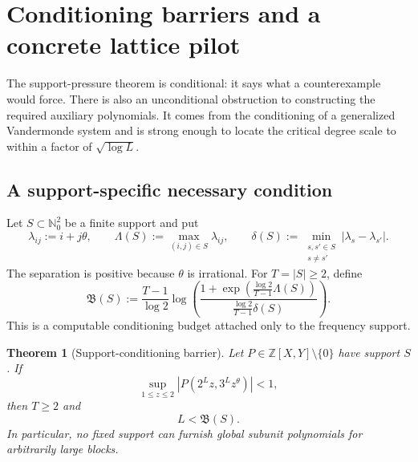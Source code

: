 \documentclass[11pt,oneside]{article}
\newtheorem{theorem}{Theorem}[section]
\theoremstyle{definition}
\theoremstyle{remark}
\newcommand{\Nzero}{\mathbb N_0}
\newcommand{\Z}{\mathbb Z}
\newcommand{\tht}{\theta}
\begin{document}
\section{Conditioning barriers and a concrete lattice pilot}
\label{sec:conditioning}

The support-pressure theorem is conditional: it says what a counterexample would force.  There is
also an unconditional obstruction to constructing the required auxiliary polynomials.  It comes
from the conditioning of a generalized Vandermonde system and is strong enough to locate the
critical degree scale to within a factor of $\sqrt{\log L}$.

\subsection{A support-specific necessary condition}

Let $S\subset\Nzero^2$ be a finite support and put
\[
  \lambda_{ij}:=i+j\tht,\qquad
  \Lambda(S):=\max_{(i,j)\in S}\lambda_{ij},\qquad
  \delta(S):=\min_{\substack{s,s'\in S\\s\ne s'}}|\lambda_s-\lambda_{s'}|.
\]
The separation is positive because $\tht$ is irrational.  For $T=|S|\ge2$, define
\begin{equation}
  \mathfrak B(S):=\frac{T-1}{\log2}
  \log\!\left(
    \frac{1+\exp\!\left(\frac{\log2}{T-1}\Lambda(S)\right)}
         {\frac{\log2}{T-1}\delta(S)}
  \right).
  \label{eq:support-conditioning-budget}
\end{equation}
This is a computable conditioning budget attached only to the frequency support.

\begin{theorem}[Support-conditioning barrier]
\label{thm:support-conditioning}
Let $P\in\Z[X,Y]\setminus\{0\}$ have support $S$.  If
\begin{equation}
  \sup_{1\le z\le2}|P(2^Lz,3^Lz^\tht)|<1,
  \label{eq:conditioning-subunit}
\end{equation}
then $T\ge2$ and
\begin{equation}
  L<\mathfrak B(S).
  \label{eq:conditioning-necessary}
\end{equation}
In particular, no fixed support can furnish global subunit polynomials for arbitrarily large
blocks.
\end{theorem}
\end{document}
